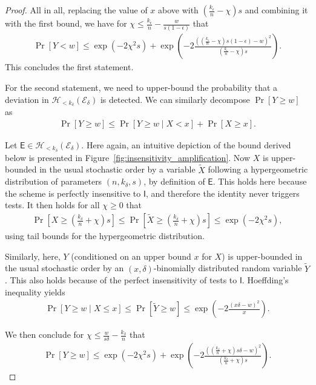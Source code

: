 \documentclass[12pt]{iopart}
\newcommand{\cptp}[1]{\mathsf{#1}} \newcommand{\pd}[1]{\mathcal{#1}}  \newcommand{\sch}[1]{\bm{#1}}
\newcommand{\Id}{\cptp{I}}
\renewcommand{\1}{\mathds{1}}
\begin{document}
\begin{proof}
	All in all, replacing the value of $x$ above with $\left( \frac{k_\epsilon}{n} - \chi \right) s$ and combining it with the first bound, we have for $\chi \leq \frac{k_\epsilon}{n} - \frac{w}{s(1-\epsilon)}$ that
	\begin{align}
		\Pr \left[ Y < w \right] \leq \exp \left( -2 \chi^2 s \right) + \exp \left( -2 \frac{\left(\left( \frac{k_\epsilon}{n} - \chi \right) s(1-\epsilon) - w\right)^2}{\left( \frac{k_\epsilon}{n} - \chi \right) s} \right).
	\end{align}
	This concludes the first statement.
	
	For the second statement, we need to upper-bound the probability that a deviation in $\mathcal{H}_{< k_\delta}(\mathcal E_\delta)$ is detected. We can similarly decompose $\Pr \left[ Y \geq w \right]$ as
	\begin{align}
		\Pr \left[ Y \geq w \right] \leq \Pr \left[ Y \geq w \mid X < x \right] + \Pr \left[ X \geq x \right].
	\end{align}	
	
	Let $\cptp E \in \mathcal{H}_{< k_\delta}(\mathcal E_\delta)$. Here again, an intuitive depiction of the bound derived below is presented in Figure~\ref{fig:insensitivity_amplification}. Now $X$ is upper-bounded in the usual stochastic order by a variable $\tilde{X}$ following a hypergeometric distribution of parameters $(n, k_\delta, s)$, by definition of $\cptp E$. This holds here because the scheme is perfectly insensitive to $\Id$, and therefore the identity never triggers tests. It then holds for all $\chi \geq 0$ that
	\begin{align}
		\Pr \left[ X \geq \left( \frac{k_\delta}{n} + \chi \right) s \right] \leq \Pr \left[ \tilde{X} \geq \left( \frac{k_\delta}{n} + \chi \right) s \right] \leq \exp \left( -2 \chi^2 s \right),
	\end{align}
	using tail bounds for the hypergeometric distribution.
	
	Similarly, here, $Y$ (conditioned on an upper bound $x$ for $X$) is upper-bounded in the usual stochastic order by an $(x, \delta)$-binomially distributed random variable $\tilde{Y}$. This also holds because of the perfect insensitivity of tests to $\Id$. Hoeffding's inequality yields
	\begin{align}
		\Pr \left[ \left. Y \geq w \; \right| \; X \leq x \right] \leq \Pr \left[ \tilde{Y} \geq w\right] \leq \exp \left( -2 \frac{(x\delta - w)^2}{x} \right).
	\end{align}
	
	We then conclude for $\chi \leq \frac{w}{s\delta} - \frac{k_\delta}{n}$ that
	\begin{align}
		\Pr \left[ Y \geq w \right] \leq \exp \left( -2 \chi^2 s \right) + \exp \left( -2 \frac{\left(\left( \frac{k_\delta}{n} + \chi \right) s\delta - w\right)^2}{\left( \frac{k_\delta}{n} + \chi \right) s} \right). \tag*{\qedhere}
	\end{align}
\end{proof}
\end{document}
